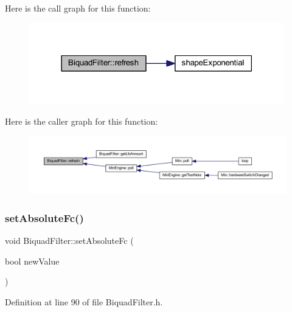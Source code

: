 Here is the call graph for this function\+:
\nopagebreak
\begin{figure}[H]
\begin{center}
\leavevmode
\includegraphics[width=314pt]{d9/d6f/class_biquad_filter_a6b84cee1d3982596d90d3b1a74208b2a_cgraph}
\end{center}
\end{figure}
Here is the caller graph for this function\+:
\nopagebreak
\begin{figure}[H]
\begin{center}
\leavevmode
\includegraphics[width=350pt]{d9/d6f/class_biquad_filter_a6b84cee1d3982596d90d3b1a74208b2a_icgraph}
\end{center}
\end{figure}
\mbox{\label{class_biquad_filter_aa557254793180f2714baee354be5b179}} 
\subsubsection{\texorpdfstring{set\+Absolute\+Fc()}{setAbsoluteFc()}}
{\footnotesize\ttfamily void Biquad\+Filter\+::set\+Absolute\+Fc (\begin{DoxyParamCaption}\item[{bool}]{new\+Value }\end{DoxyParamCaption})\hspace{0.3cm}{\ttfamily [inline]}}



Definition at line 90 of file Biquad\+Filter.\+h.

\mbox{\label{class_biquad_filter_a5bc855d79f31804b2fa8c4b7ef2fba3d}} 
